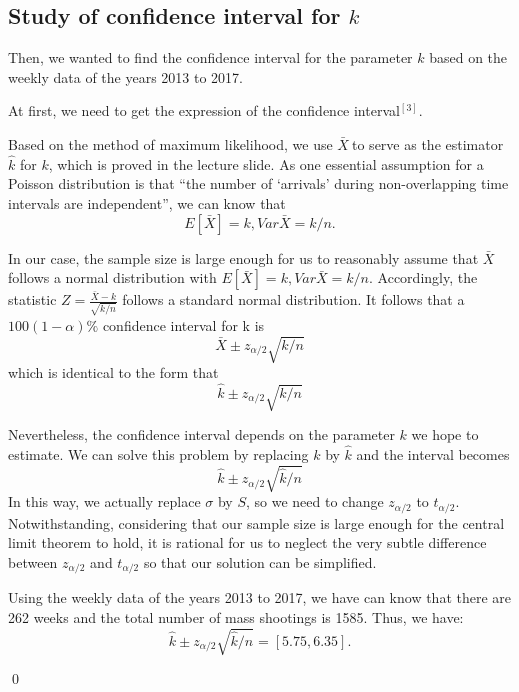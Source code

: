\documentclass[12pt]{article}
\begin{document}
\subsection{Study of confidence interval for $k$}
 Then, we wanted to find the confidence interval for the parameter $k$ based on the weekly data of the years 2013 to 2017.
 \par At first, we need to get the expression of the confidence interval$^{[3]}$.
 \par Based on the method of maximum likelihood, we use $\bar X \ $to serve as the estimator $\hat {k}$ for $k$, which is proved in the lecture slide. As one essential assumption for a Poisson distribution is that ``the number of `arrivals' during non-overlapping time intervals are independent'', we can know that
\begin{equation*}
E[\bar X]=k, Var \bar X=k/n.
\end{equation*}
\par In our case, the sample size is large enough for us to reasonably assume that $\bar X$ follows a normal distribution with $E[\bar X]=k, Var \bar X=k/n$. Accordingly, the statistic $Z=\frac{\bar X-k}{\sqrt{k/n}}$ follows a standard normal distribution. It follows that a $100(1-\alpha)\%$ confidence interval for k is
\begin{equation*}
\bar X \pm z_{\alpha/2} \sqrt{k/n}
\end{equation*}
which is identical to the form that
\begin{equation*}
\hat k \pm z_{\alpha/2} \sqrt{k/n}
\end{equation*}
\par Nevertheless, the confidence interval depends on the parameter $k$ we hope to estimate. We can solve this problem by replacing $k$ by $\hat k$ and the interval becomes
\begin{equation*}
\hat k \pm z_{\alpha/2} \sqrt{\hat k/n}
\end{equation*}
In this way, we actually replace $\sigma $ by $S$, so we need to change $z_{\alpha/2}$ to $t_{\alpha/2}$. Notwithstanding, considering that our sample size is large enough for the central limit theorem to hold, it is rational for us to neglect the very subtle difference between $z_{\alpha/2}$ and $t_{\alpha/2}$ so that our solution can be simplified.
\par Using the weekly data of the years 2013 to 2017, we have can know that there are 262 weeks and the total number of mass shootings is 1585. Thus, we have:
\begin{equation*}
\hat k \pm z_{\alpha/2} \sqrt{\hat k/n}=[ 5.75,6.35 ].
\end{equation*}
\par \qed\
\end{document}

